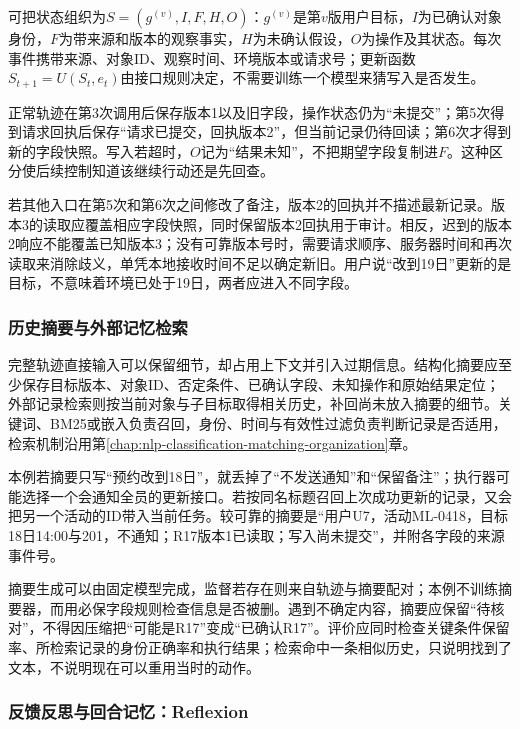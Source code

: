 可把状态组织为$S=(g^{(v)},I,F,H,O)$：$g^{(v)}$是第$v$版用户目标，$I$为已确认对象身份，$F$为带来源和版本的观察事实，$H$为未确认假设，$O$为操作及其状态。每次事件携带来源、对象ID、观察时间、环境版本或请求号；更新函数$S_{t+1}=U(S_t,e_t)$由接口规则决定，不需要训练一个模型来猜写入是否发生。

正常轨迹在第3次调用后保存版本1以及旧字段，操作状态仍为“未提交”；第5次得到请求回执后保存“请求已提交，回执版本2”，但当前记录仍待回读；第6次才得到新的字段快照。写入若超时，$O$记为“结果未知”，不把期望字段复制进$F$。这种区分使后续控制知道该继续行动还是先回查。

若其他入口在第5次和第6次之间修改了备注，版本2的回执并不描述最新记录。版本3的读取应覆盖相应字段快照，同时保留版本2回执用于审计。相反，迟到的版本2响应不能覆盖已知版本3；没有可靠版本号时，需要请求顺序、服务器时间和再次读取来消除歧义，单凭本地接收时间不足以确定新旧。用户说“改到19日”更新的是目标，不意味着环境已处于19日，两者应进入不同字段。

\subsubsection{历史摘要与外部记忆检索}
\label{sec:nlp-execution-history}

完整轨迹直接输入可以保留细节，却占用上下文并引入过期信息。结构化摘要应至少保存目标版本、对象ID、否定条件、已确认字段、未知操作和原始结果定位；外部记录检索则按当前对象与子目标取得相关历史，补回尚未放入摘要的细节。关键词、BM25或嵌入负责召回，身份、时间与有效性过滤负责判断记录是否适用，检索机制沿用第\ref{chap:nlp-classification-matching-organization}章。

本例若摘要只写“预约改到18日”，就丢掉了“不发送通知”和“保留备注”；执行器可能选择一个会通知全员的更新接口。若按同名标题召回上次成功更新的记录，又会把另一个活动的ID带入当前任务。较可靠的摘要是“用户U7，活动ML-0418，目标18日14:00与201，不通知；R17版本1已读取；写入尚未提交”，并附各字段的来源事件号。

摘要生成可以由固定模型完成，监督若存在则来自轨迹与摘要配对；本例不训练摘要器，而用必保字段规则检查信息是否被删。遇到不确定内容，摘要应保留“待核对”，不得因压缩把“可能是R17”变成“已确认R17”。评价应同时检查关键条件保留率、所检索记录的身份正确率和执行结果；检索命中一条相似历史，只说明找到了文本，不说明现在可以重用当时的动作。

\subsubsection{反馈反思与回合记忆：Reflexion}
\label{sec:nlp-execution-reflexion}

